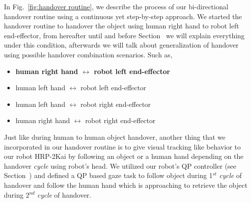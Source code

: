 In Fig.~\ref{fig:handover routine}, we describe the process of our bi-directional handover routine using a continuous yet step-by-step approach. We started the handover routine to handover the object using human right hand to robot left end-effector, from hereafter until and before Section~ we will explain everything under this condition, afterwards we will talk about generalization of handover using possible handover combination scenarios. Such as,

\begin{itemize}
    \item \textbf{human right hand $\longleftrightarrow$ robot left end-effector}
    \item human left hand $\longleftrightarrow$ robot left end-effector 
    \item human left hand $\longleftrightarrow$  robot right end-effector
    \item human right hand $\longleftrightarrow$ robot right end-effector
\end{itemize}


Just like during human to human object handover, another thing that we incorporated in our handover routine is to give visual tracking like behavior to our robot HRP-2Kai by following an object or a human hand depending on the handover \textit{cycle} using robot's head. We utilized our robot's QP controller (see Section~) and defined a QP based gaze task to follow object during 1$^{st}$ \textit{cycle} of handover and follow the human hand which is approaching to retrieve the object during 2$^{nd}$ \textit{cycle} of handover.

